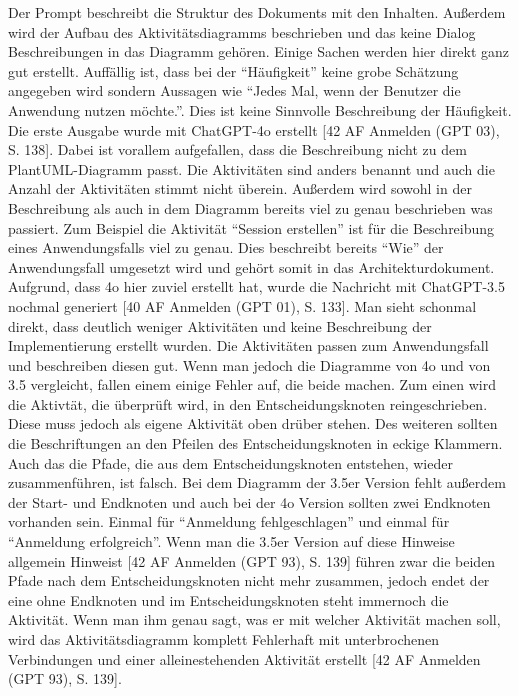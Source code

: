 Der Prompt beschreibt die Struktur des Dokuments mit den Inhalten. Außerdem wird der Aufbau des Aktivitätsdiagramms beschrieben und das keine Dialog Beschreibungen 
in das Diagramm gehören. Einige Sachen werden hier direkt ganz gut erstellt. Auffällig ist, dass bei der ``Häufigkeit'' keine grobe Schätzung angegeben wird sondern 
Aussagen wie ``Jedes Mal, wenn der Benutzer die Anwendung nutzen möchte.''. Dies ist keine Sinnvolle Beschreibung der Häufigkeit.\\

Die erste Ausgabe wurde mit ChatGPT-4o erstellt [42 AF Anmelden (GPT 03), S. 138]. Dabei ist vorallem aufgefallen, dass die Beschreibung nicht zu dem PlantUML-Diagramm passt. Die Aktivitäten
sind anders benannt und auch die Anzahl der Aktivitäten stimmt nicht überein. Außerdem wird sowohl in der Beschreibung als auch in dem Diagramm bereits 
viel zu genau beschrieben was passiert. Zum Beispiel die Aktivität ``Session erstellen'' ist für die Beschreibung eines Anwendungsfalls viel zu genau.
Dies beschreibt bereits ``Wie'' der Anwendungsfall umgesetzt wird und gehört somit in das Architekturdokument. Aufgrund, dass 4o hier zuviel erstellt hat, 
wurde die Nachricht mit ChatGPT-3.5 nochmal generiert [40 AF Anmelden (GPT 01), S. 133]. Man sieht schonmal direkt, dass deutlich weniger Aktivitäten und keine Beschreibung der Implementierung 
erstellt wurden. Die Aktivitäten passen zum Anwendungsfall und beschreiben diesen gut. Wenn man jedoch die Diagramme von 4o und von 3.5 vergleicht,
fallen einem einige Fehler auf, die beide machen. Zum einen wird die Aktivtät, die überprüft wird, in den Entscheidungsknoten reingeschrieben. Diese muss jedoch als eigene 
Aktivität oben drüber stehen. Des weiteren sollten die Beschriftungen an den Pfeilen des Entscheidungsknoten in eckige Klammern. Auch das die Pfade, die 
aus dem Entscheidungsknoten entstehen, wieder zusammenführen, ist falsch. Bei dem Diagramm der 3.5er Version fehlt außerdem der Start- und Endknoten und auch 
bei der 4o Version sollten zwei Endknoten vorhanden sein. Einmal für ``Anmeldung fehlgeschlagen'' und einmal für ``Anmeldung erfolgreich''.
Wenn man die 3.5er Version auf diese Hinweise allgemein Hinweist [42 AF Anmelden (GPT 93), S. 139] führen zwar die beiden Pfade nach dem Entscheidungsknoten nicht mehr 
zusammen, jedoch endet der eine ohne Endknoten und im Entscheidungsknoten steht immernoch die Aktivität. Wenn man ihm genau sagt, was er mit welcher Aktivität
machen soll, wird das Aktivitätsdiagramm komplett Fehlerhaft mit unterbrochenen Verbindungen und einer alleinestehenden Aktivität erstellt [42 AF Anmelden (GPT 93), S. 139].\\
